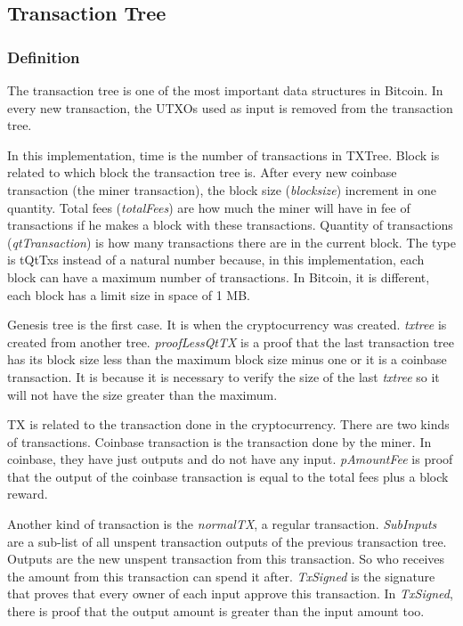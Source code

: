 \subsection{Transaction Tree}

\subsubsection{Definition}

The transaction tree is one of the most important data structures in Bitcoin.
In every new transaction, the UTXOs used as input is removed from the transaction tree.


In this implementation, time is the number of transactions in TXTree.
Block is related to which block the transaction tree is.
After every new coinbase transaction (the miner transaction), the block size (\emph{blocksize}) increment in one quantity.
Total fees (\emph{totalFees}) are how much the miner will have in fee of transactions if he makes a block with these
transactions.
Quantity of transactions (\emph{qtTransaction}) is how many transactions there are in the current block.
The type is tQtTxs instead of a natural number because, in this implementation, each block can have
a maximum number of transactions.
In Bitcoin, it is different, each block has a limit size in space of 1 MB.

Genesis tree is the first case.
It is when the cryptocurrency was created.
\emph{txtree} is created from another tree.
\emph{proofLessQtTX} is a proof that the last transaction tree has its
block size less than the maximum block size minus one or it is a coinbase transaction.
It is because it is necessary to verify the size of the last \emph{txtree} so it will not have
the size greater than the maximum.


TX is related to the transaction done in the cryptocurrency.
There are two kinds of transactions.
Coinbase transaction is the transaction done by the miner.
In coinbase, they have just outputs and do not have any input.
\emph{pAmountFee} is proof that the output of the coinbase transaction is equal to the total fees plus
a block reward.

Another kind of transaction is the \emph{normalTX}, a regular transaction.
\emph{SubInputs} are a sub-list of all unspent transaction outputs of the previous transaction tree.
Outputs are the new unspent transaction from this transaction.
So who receives the amount from this transaction can spend it after.
\emph{TxSigned} is the signature that proves that every owner of each input approve this transaction.
In \emph{TxSigned}, there is proof that the output amount is greater than the input amount too.

